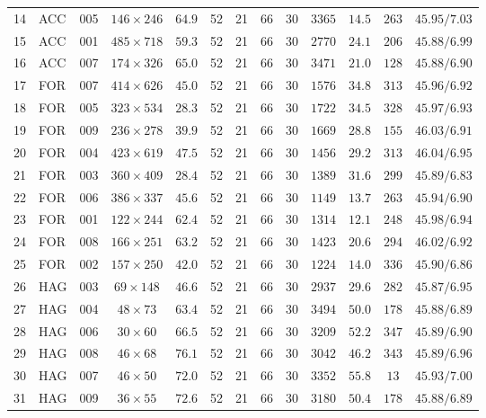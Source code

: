 \begin{table}[H]
{\begin{NiceTabular}{llccccccccccc}
14 & ACC & 005 & $146 \times 246$ & $64.9$ & 52 & 21 & 66 & 30 & $3365$ & $14.5$ & $263$ & $45.95/7.03$ \\
15 & ACC & 001 & $485 \times 718$ & $59.3$ & 52 & 21 & 66 & 30 & $2770$ & $24.1$ & $206$ & $45.88/6.99$ \\
16 & ACC & 007 & $174 \times 326$ & $65.0$ & 52 & 21 & 66 & 30 & $3471$ & $21.0$ & $128$ & $45.88/6.90$ \\
17 & FOR & 007 & $414 \times 626$ & $45.0$ & 52 & 21 & 66 & 30 & $1576$ & $34.8$ & $313$ & $45.96/6.92$ \\
18 & FOR & 005 & $323 \times 534$ & $28.3$ & 52 & 21 & 66 & 30 & $1722$ & $34.5$ & $328$ & $45.97/6.93$ \\
19 & FOR & 009 & $236 \times 278$ & $39.9$ & 52 & 21 & 66 & 30 & $1669$ & $28.8$ & $155$ & $46.03/6.91$ \\
20 & FOR & 004 & $423 \times 619$ & $47.5$ & 52 & 21 & 66 & 30 & $1456$ & $29.2$ & $313$ & $46.04/6.95$ \\
21 & FOR & 003 & $360 \times 409$ & $28.4$ & 52 & 21 & 66 & 30 & $1389$ & $31.6$ & $299$ & $45.89/6.83$ \\
22 & FOR & 006 & $386 \times 337$ & $45.6$ & 52 & 21 & 66 & 30 & $1149$ & $13.7$ & $263$ & $45.94/6.90$ \\
23 & FOR & 001 & $122 \times 244$ & $62.4$ & 52 & 21 & 66 & 30 & $1314$ & $12.1$ & $248$ & $45.98/6.94$ \\
24 & FOR & 008 & $166 \times 251$ & $63.2$ & 52 & 21 & 66 & 30 & $1423$ & $20.6$ & $294$ & $46.02/6.92$ \\
25 & FOR & 002 & $157 \times 250$ & $42.0$ & 52 & 21 & 66 & 30 & $1224$ & $14.0$ & $336$ & $45.90/6.86$ \\
26 & HAG & 003 & $69 \times 148$ & $46.6$ & 52 & 21 & 66 & 30 & $2937$ & $29.6$ & $282$ & $45.87/6.95$ \\
27 & HAG & 004 & $48 \times 73$ & $63.4$ & 52 & 21 & 66 & 30 & $3494$ & $50.0$ & $178$ & $45.88/6.89$ \\
28 & HAG & 006 & $30 \times 60$ & $66.5$ & 52 & 21 & 66 & 30 & $3209$ & $52.2$ & $347$ & $45.89/6.90$ \\
29 & HAG & 008 & $46 \times 68$ & $76.1$ & 52 & 21 & 66 & 30 & $3042$ & $46.2$ & $343$ & $45.89/6.96$ \\
30 & HAG & 007 & $46 \times 50$ & $72.0$ & 52 & 21 & 66 & 30 & $3352$ & $55.8$ & $13$ & $45.93/7.00$ \\
31 & HAG & 009 & $36 \times 55$ & $72.6$ & 52 & 21 & 66 & 30 & $3180$ & $50.4$ & $178$ & $45.88/6.89$ \\

\end{NiceTabular}}
\end{table}

